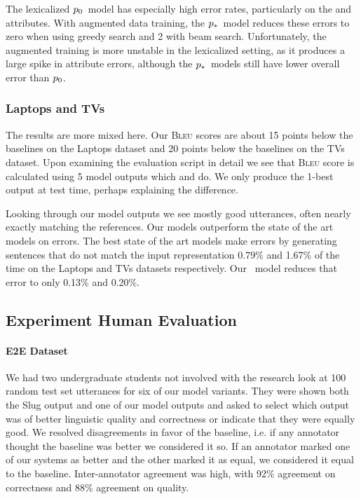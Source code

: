 The lexicalized $p_0$~model has especially high error rates, particularly
on the  and  attributes.  With augmented data training, the
$p_*$~model reduces these errors to zero when using greedy search and 2
with beam search. Unfortunately, the augmented training is more unstable in the
lexicalized setting, as it produces a large spike in  attribute
errors, although the $p_*$~models still have lower overall error than
$p_0$.

\subsubsection{Laptops and TVs}
The results are more mixed here. Our \textsc{Bleu} scores are about 15 points
below the baselines on the Laptops dataset and 20 points below the baselines on
the TVs dataset.  Upon examining  the evaluation script in detail we see that
\textsc{Bleu} score is calculated using 5 model outputs which
\citet{juraska2018} and \citet{wen2016} do. We only produce the 1-best output
at test time, perhaps explaining the difference.

Looking through our model outputs we see mostly good utterances, often nearly
exactly matching the references.  Our models outperform the state of the art
models on errors. The best state of the art models  make errors by generating
sentences that do not match the input representation 0.79\%  and 1.67\% of the
time on the Laptops and TVs datasets respectively. Our \auggen~model reduces
that error to only 0.13\% and 0.20\%.



\subsection{Experiment Human Evaluation} 

\paragraph{E2E Dataset} We had two undergraduate students not involved with the
research look at 100 random test set utterances for six of our model variants.
They were shown both the Slug output and one of our model outputs and asked to
select which output was of better linguistic quality and correctness or
indicate that they were equally good.  We resolved disagreements in favor of
the baseline, i.e. if any annotator thought the baseline was better we
considered it so.  If an annotator marked one of our systems as better and the
other marked it as equal, we considered it equal to the baseline.
Inter-annotator agreement was high, with 92\% agreement on correctness and 88\%
agreement on quality.

